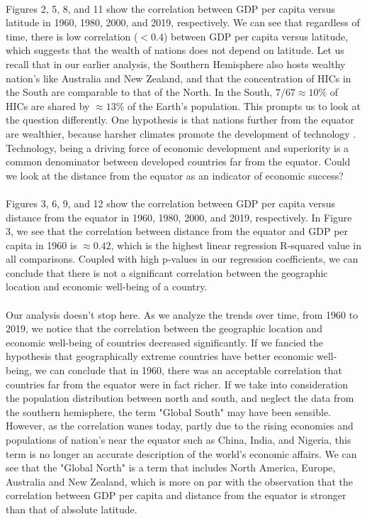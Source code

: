 \documentclass[15pt]{article}
\begin{document}
\\
Figures 2, 5, 8, and 11 show the correlation between GDP per capita versus latitude in 1960, 1980, 2000, and 2019, respectively. We can see that regardless of time, there is low correlation ($ <0.4$) between GDP per capita versus latitude, which suggests that the wealth of nations does not depend on latitude. Let us recall that in our earlier analysis, the Southern Hemisphere also hosts wealthy nation's like Australia and New Zealand, and that the concentration of HICs in the South are comparable to that of the North. In the South, $7/67 \approx 10\%$ of HICs are shared by $\approx 13\%$ of the Earth's population. This prompts us to look at the question differently. One hypothesis is that nations further from the equator are wealthier, because harsher climates promote the development of technology \cite{4}. Technology, being a driving force of economic development and superiority is a common denominator between developed countries far from the equator. Could we look at the distance from the equator as an indicator of economic success? \\
\\
Figures 3, 6, 9, and 12 show the correlation between GDP per capita versus distance from the equator in 1960, 1980, 2000, and 2019, respectively. In Figure 3, we see that the correlation between distance from the equator and GDP per capita in 1960 is $\approx 0.42$, which is the highest linear regression R-squared value in all comparisons. Coupled with high p-values in our regression coefficients, we can conclude that there is not a significant correlation between the geographic location and economic well-being of a country. \\
\\
Our analysis doesn't stop here. As we analyze the trends over time, from 1960 to 2019, we notice that the correlation between the geographic location and economic well-being of countries decreased significantly. If we fancied the hypothesis that geographically extreme countries have better economic well-being, we can conclude that in 1960, there was an acceptable correlation that countries far from the equator were in fact richer. If we take into consideration the population distribution between north and south, and neglect the data from the southern hemisphere, the term "Global South" may have been sensible. However, as the correlation wanes today, partly due to the rising economies and populations of nation's near the equator such as China, India, and Nigeria, this term is no longer an accurate description of the world's economic affairs. We can see that the "Global North" is a term that includes North America, Europe, Australia and New Zealand, which is more on par with the observation that the correlation between GDP per capita and distance from the equator is stronger than that of absolute latitude.\\
\end{document}
